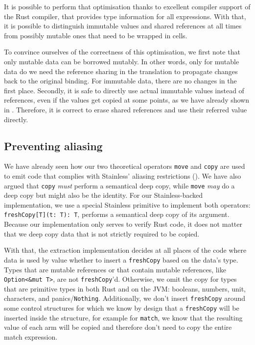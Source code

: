 It is possible to perform that optimisation thanks to excellent compiler support
of the Rust compiler, that provides type information for all expressions. With
that, it is  possible to distinguish immutable values and shared references at
all times from  possibly mutable ones that need to be wrapped in cells.

To convince ourselves of the correctness of this optimisation, we first note
that only mutable data can be borrowed mutably. In other words, only for mutable
data do we need the reference sharing in the translation to propagate changes
back to the original binding. For immutable data, there are no changes in the
first place. Secondly, it is safe to directly use actual immutable values
instead of references, even if the values get copied at some points, as we have
already shown in . Therefore, it is correct to
erase shared references and use their referred value directly.

\subsection{Preventing aliasing}

We have already seen how our two theoretical operators \lstinline!move! and
\lstinline!copy! are used to emit code that complies with Stainless' aliasing
restrictions (). We have also argued that
\lstinline!copy! \emph{must} perform a semantical deep copy, while
\lstinline!move! \emph{may} do a deep copy but might also be the identity. For
our Stainless-backed implementation, we use a special Stainless primitive to
implement both operators: \lstinline!freshCopy[T](t: T): T!, performs a
semantical deep copy of its argument. Because our implementation only serves to
verify Rust code, it does not matter that we deep copy data that is not strictly
required to be copied.

With that, the extraction implementation decides at all places of the code where
data is used by value whether to insert a \lstinline!freshCopy! based on the
data's type. Types that are mutable references or that contain mutable
references, like \lstinline!Option<&mut T>!, are not \lstinline!freshCopy!'d.
Otherwise, we omit the copy for types that are primitive types in both Rust and
on the JVM: booleans, numbers, unit, characters, and panics/\lstinline!Nothing!.
Additionally, we don't insert \lstinline!freshCopy! around some control
structures for which we know by design that a \lstinline!freshCopy! will be
inserted inside the structure, for example for \lstinline!match!, we know that
the resulting value of each arm will be copied and therefore don't need to copy
the entire match expression.

